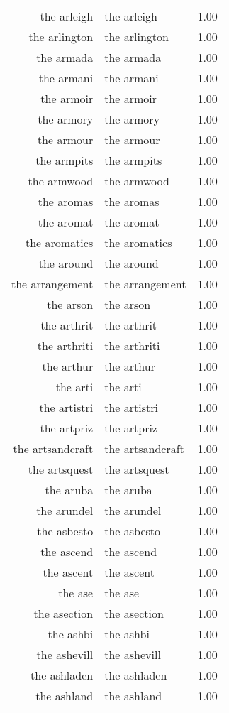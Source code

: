 \begin{table}[ht]
\begin{tabular}{rlr}
  the arleigh & the arleigh & 1.00 \\ 
  the arlington & the arlington & 1.00 \\ 
  the armada & the armada & 1.00 \\ 
  the armani & the armani & 1.00 \\ 
  the armoir & the armoir & 1.00 \\ 
  the armory & the armory & 1.00 \\ 
  the armour & the armour & 1.00 \\ 
  the armpits & the armpits & 1.00 \\ 
  the armwood & the armwood & 1.00 \\ 
  the aromas & the aromas & 1.00 \\ 
  the aromat & the aromat & 1.00 \\ 
  the aromatics & the aromatics & 1.00 \\ 
  the around & the around & 1.00 \\ 
  the arrangement & the arrangement & 1.00 \\ 
  the arson & the arson & 1.00 \\ 
  the arthrit & the arthrit & 1.00 \\ 
  the arthriti & the arthriti & 1.00 \\ 
  the arthur & the arthur & 1.00 \\ 
  the arti & the arti & 1.00 \\ 
  the artistri & the artistri & 1.00 \\ 
  the artpriz & the artpriz & 1.00 \\ 
  the artsandcraft & the artsandcraft & 1.00 \\ 
  the artsquest & the artsquest & 1.00 \\ 
  the aruba & the aruba & 1.00 \\ 
  the arundel & the arundel & 1.00 \\ 
  the asbesto & the asbesto & 1.00 \\ 
  the ascend & the ascend & 1.00 \\ 
  the ascent & the ascent & 1.00 \\ 
  the ase & the ase & 1.00 \\ 
  the asection & the asection & 1.00 \\ 
  the ashbi & the ashbi & 1.00 \\ 
  the ashevill & the ashevill & 1.00 \\ 
  the ashladen & the ashladen & 1.00 \\ 
  the ashland & the ashland & 1.00 \\ 

\end{tabular}
\end{table}
